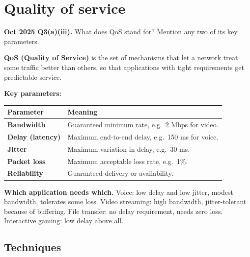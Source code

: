 \documentclass[11pt,a4paper]{article}
\begin{document}
\section{Quality of service}

\begin{pyqbox}
\textbf{Oct 2025 Q3(a)(iii).} What does QoS stand for? Mention any two of its key parameters.
\end{pyqbox}

\begin{solbox}
\textbf{QoS (Quality of Service)} is the set of mechanisms that let a network treat some traffic better than others, so that applications with tight requirements get predictable service.

\textbf{Key parameters:}
\begin{center}\small
\begin{tabularx}{\textwidth}{>{\bfseries}p{} X}
\toprule Parameter & Meaning\\
\midrule
Bandwidth & Guaranteed minimum rate, e.g.\ 2 Mbps for video.\\
Delay (latency) & Maximum end-to-end delay, e.g.\ 150 ms for voice.\\
Jitter & Maximum variation in delay, e.g.\ 30 ms.\\
Packet loss & Maximum acceptable loss rate, e.g.\ 1\%.\\
Reliability & Guaranteed delivery or availability.\\
\bottomrule
\end{tabularx}
\end{center}

\begin{rememberbox}
\textbf{Which application needs which.} Voice: low delay and low jitter, modest bandwidth, tolerates some loss. Video streaming: high bandwidth, jitter-tolerant because of buffering. File transfer: no delay requirement, needs zero loss. Interactive gaming: low delay above all.
\end{rememberbox}
\end{solbox}

\subsection{Techniques}
\end{document}
